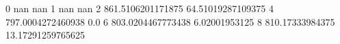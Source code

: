 0 nan nan
1 nan nan
2 861.5106201171875 64.51019287109375
4 797.0004272460938 0.0
6 803.0204467773438 6.02001953125
8 810.17333984375 13.17291259765625
